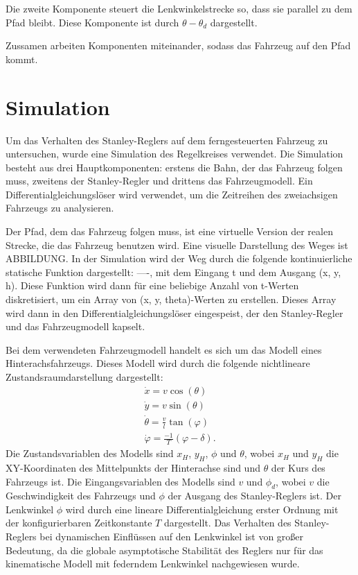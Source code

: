 \documentclass[arbeit=studie,oneside,BCOR=12mm]{ArbeitRST}
\begin{document}
Die zweite Komponente steuert die Lenkwinkelstrecke so, dass sie parallel zu
dem Pfad bleibt. Diese Komponente ist durch $\theta - \theta_d$ dargestellt.

Zussamen arbeiten Komponenten miteinander, sodass das Fahrzeug auf den Pfad
kommt. 







\section{Simulation}


Um das Verhalten des Stanley-Reglers auf dem ferngesteuerten Fahrzeug zu 
untersuchen, wurde eine Simulation des Regelkreises verwendet.
Die Simulation besteht aus drei Hauptkomponenten: erstens die Bahn, der das 
Fahrzeug folgen muss, zweitens der Stanley-Regler und drittens das 
Fahrzeugmodell. Ein Differentialgleichungslöser wird verwendet, um die 
Zeitreihen des zweiachsigen Fahrzeugs zu analysieren. 

Der Pfad, dem das Fahrzeug folgen muss, ist eine virtuelle Version der realen 
Strecke, die das Fahrzeug benutzen wird. Eine visuelle Darstellung des Weges 
ist ABBILDUNG. In der Simulation wird der Weg durch die folgende kontinuierliche
statische Funktion dargestellt:
----, 
mit dem Eingang t und dem Ausgang (x, y, h). Diese Funktion wird dann für eine 
beliebige Anzahl von t-Werten diskretisiert, um ein Array von 
(x, y, theta)-Werten zu erstellen. Dieses Array wird dann in den 
Differentialgleichungslöser eingespeist, der den Stanley-Regler und das 
Fahrzeugmodell kapselt. 

Bei dem verwendeten Fahrzeugmodell handelt es sich um das Modell eines 
Hinterachsfahrzeugs. Dieses Modell wird durch die folgende nichtlineare 
Zustandsraumdarstellung dargestellt:
\begin{gather}
    \dot{x} = v \cos(\theta) \\
    \dot{y} = v \sin(\theta) \\
    \dot{\theta} = \frac{v}{l}\tan(\varphi) \\
    \dot{\varphi} = \frac{-1}{T}\left(\varphi - \delta\right).
\end{gather}
Die Zustandsvariablen des Modells sind $x_H$, $y_H$, $\phi$ und $\theta$, wobei
$x_H$ und $y_H$ die XY-Koordinaten des Mittelpunkts der Hinterachse sind und
$\theta$ der Kurs des Fahrzeugs ist. Die Eingangsvariablen des Modells sind $v$
und $\phi_d$, wobei $v$ die Geschwindigkeit des Fahrzeugs und $\phi$ der
Ausgang des Stanley-Reglers ist. Der Lenkwinkel $\phi$ wird durch eine lineare
Differentialgleichung erster Ordnung mit der konfigurierbaren Zeitkonstante $T$
dargestellt. Das Verhalten des Stanley-Reglers bei dynamischen Einflüssen auf
den Lenkwinkel ist von großer Bedeutung, da die globale asymptotische
Stabilität des Reglers nur für das kinematische Modell mit federndem Lenkwinkel
nachgewiesen wurde. 
\end{document}
